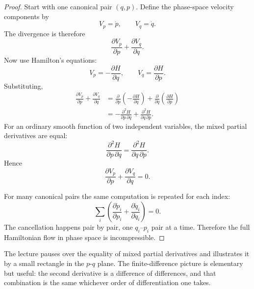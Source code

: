 \begin{proof}
Start with one canonical pair \((q,p)\). Define the phase-space velocity components by
\begin{equation}
V_p=\dot p, \qquad V_q=\dot q.
\end{equation}
The divergence is therefore
\begin{equation}
\frac{\partial V_p}{\partial p}+\frac{\partial V_q}{\partial q}.
\end{equation}
Now use Hamilton's equations:
\begin{equation}
V_p=-\frac{\partial H}{\partial q}, \qquad V_q=\frac{\partial H}{\partial p}.
\end{equation}
Substituting,
\begin{align}
\frac{\partial V_p}{\partial p}+\frac{\partial V_q}{\partial q}
&=
\frac{\partial}{\partial p}\!\left(-\frac{\partial H}{\partial q}\right)
+
\frac{\partial}{\partial q}\!\left(\frac{\partial H}{\partial p}\right) \\
&=
-\frac{\partial^2 H}{\partial p\,\partial q}
+
\frac{\partial^2 H}{\partial q\,\partial p}.
\end{align}
For an ordinary smooth function of two independent variables, the mixed partial derivatives are equal:
\begin{equation}
\frac{\partial^2 H}{\partial p\,\partial q}
=
\frac{\partial^2 H}{\partial q\,\partial p}.
\end{equation}
Hence
\begin{equation}
\frac{\partial V_p}{\partial p}+\frac{\partial V_q}{\partial q}=0.
\end{equation}

For many canonical pairs the same computation is repeated for each index:
\begin{equation}
\sum_i\left(
\frac{\partial \dot p_i}{\partial p_i}
+
\frac{\partial \dot q_i}{\partial q_i}
\right)=0.
\end{equation}
The cancellation happens pair by pair, one \(q_i\)--\(p_i\) pair at a time. Therefore the full Hamiltonian flow in phase space is incompressible.
\end{proof}

The lecture pauses over the equality of mixed partial derivatives and illustrates it by a small rectangle in the \(p\)-\(q\) plane. The finite-difference picture is elementary but useful: the second derivative is a difference of differences, and that combination is the same whichever order of differentiation one takes.

